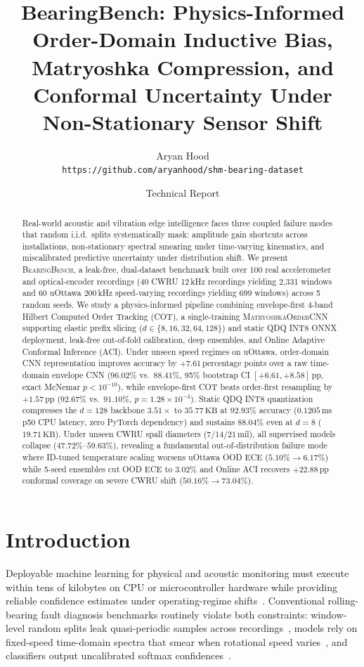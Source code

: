 \documentclass[10pt,twocolumn]{article}
\title{\textbf{BearingBench: Physics-Informed Order-Domain Inductive Bias, Matryoshka Compression, and Conformal Uncertainty Under Non-Stationary Sensor Shift}}
\author{
  Aryan Hood \\
  \texttt{https://github.com/aryanhood/shm-bearing-dataset}
}
\date{Technical Report}
\begin{document}
\maketitle

\begin{abstract}
Real-world acoustic and vibration edge intelligence faces three coupled failure modes that random i.i.d.\ splits systematically mask: amplitude gain shortcuts across installations, non-stationary spectral smearing under time-varying kinematics, and miscalibrated predictive uncertainty under distribution shift. We present \textsc{BearingBench}, a leak-free, dual-dataset benchmark built over 100 real accelerometer and optical-encoder recordings (40 CWRU 12\,kHz recordings yielding 2,331 windows and 60 uOttawa 200\,kHz speed-varying recordings yielding 699 windows) across 5 random seeds. We study a physics-informed pipeline combining envelope-first 4-band Hilbert Computed Order Tracking (COT), a single-training \textsc{MatryoshkaOrderCNN} supporting elastic prefix slicing ($d \in \{8, 16, 32, 64, 128\}$) and static QDQ INT8 ONNX deployment, leak-free out-of-fold calibration, deep ensembles, and Online Adaptive Conformal Inference (ACI). Under unseen speed regimes on uOttawa, order-domain CNN representation improves accuracy by $+7.61$\,percentage points over a raw time-domain envelope CNN ($96.02\%$ vs.\ $88.41\%$, 95\% bootstrap CI $[+6.61, +8.58]$\,pp, exact McNemar $p < 10^{-10}$), while envelope-first COT beats order-first resampling by $+1.57$\,pp ($92.67\%$ vs.\ $91.10\%$, $p = 1.28 \times 10^{-4}$). Static QDQ INT8 quantization compresses the $d=128$ backbone $3.51\times$ to $35.77\,\text{KB}$ at $92.93\%$ accuracy ($0.1205\,\text{ms}$ p50 CPU latency, zero PyTorch dependency) and sustains $88.04\%$ even at $d=8$ ($19.71\,\text{KB}$). Under unseen CWRU spall diameters ($7/14/21$\,mil), all supervised models collapse ($47.72\%$--$59.63\%$), revealing a fundamental out-of-distribution failure mode where ID-tuned temperature scaling worsens uOttawa OOD ECE ($5.10\% \rightarrow 6.17\%$) while 5-seed ensembles cut OOD ECE to $3.02\%$ and Online ACI recovers $+22.88$\,pp conformal coverage on severe CWRU shift ($50.16\% \rightarrow 73.04\%$).
\end{abstract}

\section{Introduction}
Deployable machine learning for physical and acoustic monitoring must execute within tens of kilobytes on CPU or microcontroller hardware while providing reliable confidence estimates under operating-regime shifts~\cite{das2024timesfm,baur2024hear,narayanswamy2025lsm,zhang2025sensorlm}. Conventional rolling-bearing fault diagnosis benchmarks routinely violate both constraints: window-level random splits leak quasi-periodic samples across recordings~\cite{smith2015cwru,zhao2020deep}, models rely on fixed-speed time-domain spectra that smear when rotational speed varies~\cite{randall2011tutorial,huang2018uottawa}, and classifiers output uncalibrated softmax confidences~\cite{guo2017calibration,ovadia2019trust}.
\end{document}
